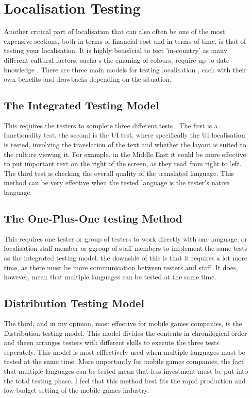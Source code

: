 \documentclass{scrartcl}
\begin{document}
\section{Localisation Testing}
Another critical part of localisation that can also often be one of the most expensive sections, both in terms of financial cost and in terms of time, is that of testing your localisation. It is highly beneficial to tect 'in-country' as many different cultural factors, sucha s the emaning of colours, require up to date knowledge \cite {collins2002software}. There are three main models for testing localisation \cite {zhao2010study}, each with their own benefits and drawbacks depending on the situation.
\subsection{The Integrated Testing Model}
This requires the testers to somplete three different tests \cite {zhao2010study}. The first is a functionality test. the second is the UI test, where specifically the UI localisation is tested, involving the translation of the text and whether the layout is suited to the culture viewing it. For example, in the Middle East it could be more effective to put important text on the right of the screen, as they read from right to left. The third test is checking the overall quality of the translated language. This method can be very effective when the tested language is the tester's native language.
\subsection{The One-Plus-One testing Method}
This requires one tester or group of testers to work directly with one language, or localisation staff member or ggroup of staff members to implement the same tests as the integrated testing model. the downside of this is that it requires a lot more time, as there must be more communication between testers and staff. It does, however, mean that multiple languages can be tested at the same time.
\subsection{Distribution Testing Model}
The third, and in my opinion, most effective for mobile games companies, is the Distribution testing model. This model divides the contents in chronilogical order and theen arranges testers with different skills to execute the three tests seperately. This model is most efffectively used when multiple languages must be tested at the same time. More importantly for mobile games companies, the fact that multiple languages can be tested mean that less investment must be put into the total testing phase. I feel that this method best fits the rapid production and low budget setting of the mobile games industry.
\end{document}
